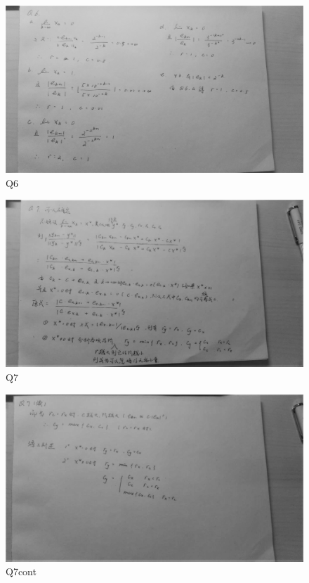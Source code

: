 \documentclass{article}
\begin{document}
\begin{figure}[ht]
  \centering
  \includegraphics[scale=0.1]{Q6.jpg}
  \caption{Q6}
  \label{fig:label}
\end{figure}

\begin{figure}[ht]
  \centering
  \includegraphics[scale=0.3]{Q7.jpg}
  \caption{Q7}
  \label{fig:label}
\end{figure}

\begin{figure}[ht]
  \centering
  \includegraphics[scale=0.3]{Q7_cont.jpg}
  \caption{Q7cont}
  \label{fig:label}
\end{figure}
\end{document}
